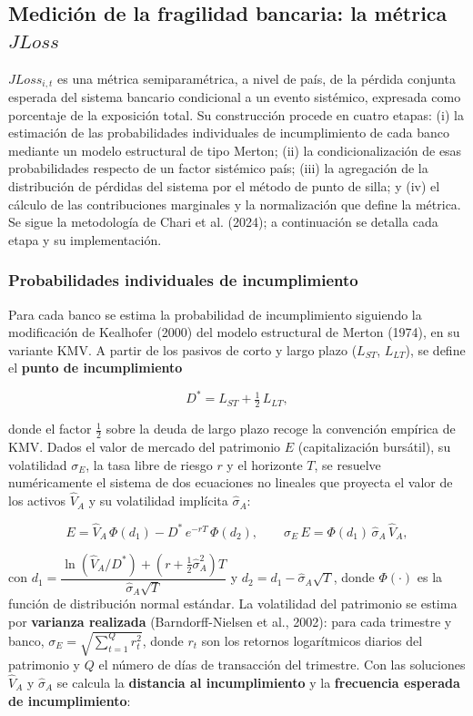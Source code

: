\documentclass[5p,times,twocolumn,authoryear]{elsarticle}
\begin{document}
\subsection{Medición de la fragilidad bancaria: la métrica $JLoss$}

$JLoss_{i,t}$ es una métrica semiparamétrica, a nivel de país, de la pérdida conjunta esperada del sistema bancario condicional a un evento sistémico, expresada como porcentaje de la exposición total. Su construcción procede en cuatro etapas: (i) la estimación de las probabilidades individuales de incumplimiento de cada banco mediante un modelo estructural de tipo Merton; (ii) la condicionalización de esas probabilidades respecto de un factor sistémico país; (iii) la agregación de la distribución de pérdidas del sistema por el método de punto de silla; y (iv) el cálculo de las contribuciones marginales y la normalización que define la métrica. Se sigue la metodología de Chari et al. (2024); a continuación se detalla cada etapa y su implementación.

\subsubsection{Probabilidades individuales de incumplimiento}

Para cada banco se estima la probabilidad de incumplimiento siguiendo la modificación de Kealhofer (2000) del modelo estructural de Merton (1974), en su variante KMV. A partir de los pasivos de corto y largo plazo ($L_{ST}$, $L_{LT}$), se define el \textbf{punto de incumplimiento}

\[ D^{*} = L_{ST} + \tfrac{1}{2}\,L_{LT}, \]

donde el factor $\tfrac{1}{2}$ sobre la deuda de largo plazo recoge la convención empírica de KMV. Dados el valor de mercado del patrimonio $E$ (capitalización bursátil), su volatilidad $\sigma_E$, la tasa libre de riesgo $r$ y el horizonte $T$, se resuelve numéricamente el sistema de dos ecuaciones no lineales que proyecta el valor de los activos $\hat V_A$ y su volatilidad implícita $\hat\sigma_A$:

\[ E = \hat V_A\,\Phi(d_1) - D^{*}\,e^{-rT}\,\Phi(d_2), \qquad \sigma_E\,E = \Phi(d_1)\,\hat\sigma_A\,\hat V_A, \]

con $d_1 = \dfrac{\ln(\hat V_A/D^{*}) + \left(r + \tfrac{1}{2}\hat\sigma_A^{2}\right)T}{\hat\sigma_A\sqrt{T}}$ y $d_2 = d_1 - \hat\sigma_A\sqrt{T}$, donde $\Phi(\cdot)$ es la función de distribución normal estándar. La volatilidad del patrimonio se estima por \textbf{varianza realizada} (Barndorff-Nielsen et al., 2002): para cada trimestre y banco, $\sigma_E = \sqrt{\sum_{t=1}^{Q} r_t^{2}}$, donde $r_t$ son los retornos logarítmicos diarios del patrimonio y $Q$ el número de días de transacción del trimestre. Con las soluciones $\hat V_A$ y $\hat\sigma_A$ se calcula la \textbf{distancia al incumplimiento} y la \textbf{frecuencia esperada de incumplimiento}:
\end{document}
